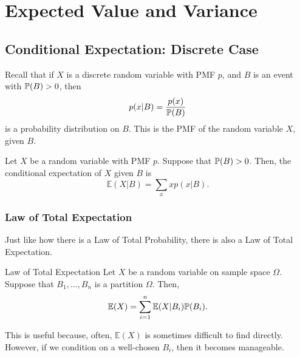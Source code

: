 \documentclass[letterpaper]{article}
\begin{document}
\section{Expected Value and Variance}
\subsection{Conditional Expectation: Discrete Case}
Recall that if $X$ is a discrete random variable with PMF $p$, and $B$ is an event with $\mathbb{P}(B) > 0$, then 
\[p(x | B) = \frac{p(x)}{\mathbb{P}(B)}\]
is a probability distribution on $B$. This is the PMF of the random variable $X$, given $B$. 

\begin{definition}{}{}
    Let $X$ be a random variable with PMF $p$. Suppose that $\mathbb{P}(B) > 0$. Then, the conditional expectation of $X$ given $B$ is 
    \[\mathbb{E}(X | B) = \sum_{x} xp(x | B).\]    
\end{definition}


\subsubsection{Law of Total Expectation}
Just like how there is a Law of Total Probability, there is also a Law of Total Expectation. 
\begin{theorem}{Law of Total Expectation}{}
    Let $X$ be a random variable on sample space $\Omega$. Suppose that $B_1, \dots, B_n$ is a partition $\Omega$. Then, 
    \[\mathbb{E}(X) = \sum_{i = 1}^{n} \mathbb{E}(X | B_i) \mathbb{P}(B_i).\]
\end{theorem}
This is useful because, often, $\mathbb{E}(X)$ is sometimes difficult to find directly. However, if we condition on a well-chosen $B_i$, then it becomes manageable. 
\end{document}
